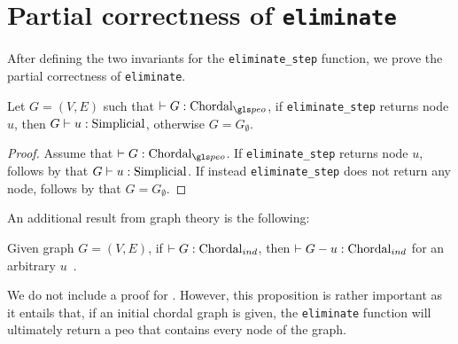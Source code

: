 \section{Partial correctness of \texttt{eliminate}}

After defining the two invariants for the \texttt{eliminate\_step} function, we prove the partial correctness of \texttt{eliminate}.

\begin{theorem}\label{thm:par-cor}
    Let $G = (V, E)$ such that $\chordalpeo{G}$, if \texttt{eliminate\_step} returns node $u$, then $\simplicial{u}{G}$, otherwise $G = G_\emptyset$. \Coqed
\end{theorem}
\begin{proof}
    Assume that $\chordalpeo{G}$. If \texttt{eliminate\_step} returns node $u$, follows by  that $\simplicial{u}{G}$. If instead \texttt{eliminate\_step} does not return any node, follows by  that $G = G_\emptyset$.
\end{proof}

An additional result from graph theory is the following:

\begin{theorem}\label{thm:cho-inv}
    Given graph $G = (V, E)$, if $\chordalind{G}$, then $\chordalind{G - u}$ for an arbitrary $u$~\cite{golumbic2004algorithmic}.
\end{theorem}

We do not include a proof for . However, this proposition is rather important as it entails that, if an initial chordal graph is given, the \texttt{eliminate} function will ultimately return a \gls{peo} that contains every node of the graph.